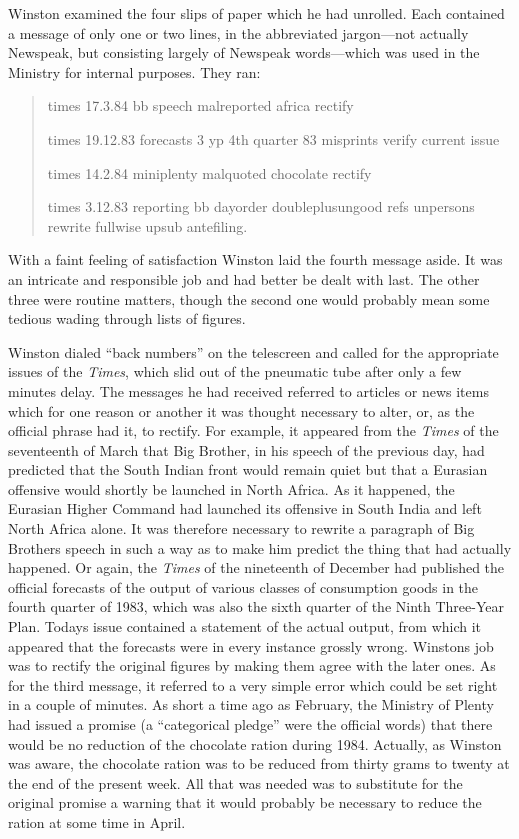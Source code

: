 Winston examined the four slips of paper which he had unrolled. Each
contained a message of only one or two lines, in the abbreviated
jargon---not actually Newspeak, but consisting largely of Newspeak
words---which was used in the Ministry for internal purposes. They ran:

\begin{quotation}
times 17.3.84 bb speech malreported africa rectify

times 19.12.83 forecasts 3 yp 4th quarter 83 misprints verify current
issue

times 14.2.84 miniplenty malquoted chocolate rectify

times 3.12.83 reporting bb dayorder doubleplusungood refs unpersons
rewrite fullwise upsub antefiling.
\end{quotation}

With a faint feeling of satisfaction Winston laid the fourth message
aside. It was an intricate and responsible job and had better be dealt
with last. The other three were routine matters, though the second one
would probably mean some tedious wading through lists of figures.

Winston dialed ``back numbers'' on the telescreen and called for the
appropriate issues of the \emph{Times}, which slid out of the pneumatic
tube after only a few minutes\textquotesingle{} delay. The messages he
had received referred to articles or news items which for one reason or
another it was thought necessary to alter, or, as the official phrase
had it, to rectify. For example, it appeared from the \emph{Times} of
the seventeenth of March that Big Brother, in his speech of the previous
day, had predicted that the South Indian front would remain quiet but
that a Eurasian offensive would shortly be launched in North Africa. As
it happened, the Eurasian Higher Command had launched its offensive in
South India and left North Africa alone. It was therefore necessary to
rewrite a paragraph of Big Brother\textquotesingle s speech in such a
way as to make him predict the thing that had actually happened. Or
again, the \emph{Times} of the nineteenth of December had published the
official forecasts of the output of various classes of consumption goods
in the fourth quarter of 1983, which was also the sixth quarter of the
Ninth Three-Year Plan. Today\textquotesingle s issue contained a
statement of the actual output, from which it appeared that the
forecasts were in every instance grossly wrong.
Winston\textquotesingle s job was to rectify the original figures by
making them agree with the later ones. As for the third message, it
referred to a very simple error which could be set right in a couple of
minutes. As short a time ago as February, the Ministry of Plenty had
issued a promise (a ``categorical pledge'' were the official words) that
there would be no reduction of the chocolate ration during 1984.
Actually, as Winston was aware, the chocolate ration was to be reduced
from thirty grams to twenty at the end of the present week. All that was
needed was to substitute for the original promise a warning that it
would probably be necessary to reduce the ration at some time in April.

